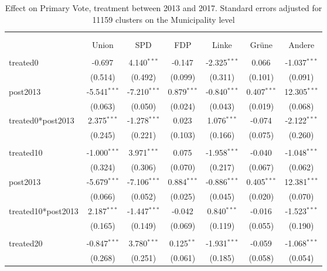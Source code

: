 \documentclass[12pt]{article}
\begin{document}
 
\begin{table}[!htbp] \centering
  \caption{Effect on Primary Vote, treatment between 2013 and 2017. Standard errors adjusted for 11159 clusters on the Municipality level}
\begin{tabular}{@{\extracolsep{5pt}}lcccccc}
\\[-1.8ex]\hline
\hline \\[-1.8ex]
\\[-1.8ex] & \multicolumn{1}{c}{Union} & \multicolumn{1}{c}{SPD} & \multicolumn{1}{c}{FDP} & \multicolumn{1}{c}{Linke} & \multicolumn{1}{c}{Grüne} & \multicolumn{1}{c}{Andere}  \\
\hline \\[-1.8ex]
 treated0 & -0.697$^{}$ & 4.140$^{***}$ & -0.147$^{}$ & -2.325$^{***}$ & 0.066$^{}$ & -1.037$^{***}$ \\
  & (0.514) & (0.492) & (0.099) & (0.311) & (0.101) & (0.091) \\
 post2013 & -5.541$^{***}$ & -7.210$^{***}$ & 0.879$^{***}$ & -0.840$^{***}$ & 0.407$^{***}$ & 12.305$^{***}$ \\
  & (0.063) & (0.050) & (0.024) & (0.043) & (0.019) & (0.068) \\
 treated0*post2013 & 2.375$^{***}$ & -1.278$^{***}$ & 0.023$^{}$ & 1.076$^{***}$ & -0.074$^{}$ & -2.122$^{***}$ \\
  & (0.245) & (0.221) & (0.103) & (0.166) & (0.075) & (0.260) \\
\hline \\[-1.8ex]
 treated10 & -1.000$^{***}$ & 3.971$^{***}$ & 0.075$^{}$ & -1.958$^{***}$ & -0.040$^{}$ & -1.048$^{***}$ \\
  & (0.324) & (0.306) & (0.070) & (0.217) & (0.067) & (0.062) \\
 post2013 & -5.679$^{***}$ & -7.106$^{***}$ & 0.884$^{***}$ & -0.886$^{***}$ & 0.405$^{***}$ & 12.381$^{***}$ \\
  & (0.066) & (0.052) & (0.025) & (0.045) & (0.020) & (0.070) \\
 treated10*post2013 & 2.187$^{***}$ & -1.447$^{***}$ & -0.042$^{}$ & 0.840$^{***}$ & -0.016$^{}$ & -1.523$^{***}$ \\
  & (0.165) & (0.149) & (0.069) & (0.119) & (0.055) & (0.190) \\
\hline \\[-1.8ex]
 treated20 & -0.847$^{***}$ & 3.780$^{***}$ & 0.125$^{**}$ & -1.931$^{***}$ & -0.059$^{}$ & -1.068$^{***}$ \\
  & (0.268) & (0.251) & (0.061) & (0.185) & (0.058) & (0.054) \\

\end{tabular}
\end{table}
\end{document}
